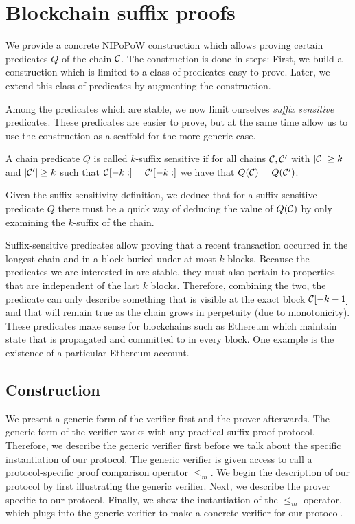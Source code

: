 \section{Blockchain suffix proofs}

We provide a concrete NIPoPoW construction which allows proving certain
predicates $Q$ of the chain $\mathcal{C}$. The construction is done in steps: First,
we build a construction which is limited to a class of predicates easy to prove.
Later, we extend this class of predicates by augmenting the construction.

Among the predicates which are stable, we now limit ourselves \textit{suffix
sensitive} predicates. These predicates are easier to prove, but at the same
time allow us to use the construction as a scaffold for the more generic case.

\begin{definition}
A chain predicate $Q$ is called $k$-\textnormal{suffix sensitive} if for all
chains $\mathcal{C}, \mathcal{C}'$ with $|\mathcal{C}| \geq k$ and $|\mathcal{C}'| \geq k$ such that
$\mathcal{C}[-k:] = \mathcal{C}'[-k:]$ we have that $Q(\mathcal{C}) = Q(\mathcal{C}')$.
\end{definition}

Given the suffix-sensitivity definition, we deduce that for a suffix-sensitive
predicate $Q$ there must be a quick way of deducing the value of $Q(\mathcal{C})$ by
only examining the $k$-suffix of the chain.

Suffix-sensitive predicates allow proving that a recent transaction occurred in
the longest chain and in a block buried under at most $k$ blocks. Because the
predicates we are interested in are stable, they must also pertain to properties
that are independent of the last $k$ blocks. Therefore, combining the two, the
predicate can only describe something that is visible at the exact block
$\mathcal{C}[-k-1]$ and that will remain true as the chain grows in perpetuity (due
to monotonicity). These predicates make sense for blockchains such as Ethereum
which maintain state \cite{vitalik} that is propagated and committed to in every
block. One example is the existence of a particular Ethereum account.

\subsection{Construction}

We present a generic form of the verifier first and the prover afterwards. The
generic form of the verifier works with any practical suffix proof protocol.
Therefore, we describe the generic verifier first before we talk about the
specific instantiation of our protocol. The generic verifier is given access to
call a protocol-specific proof comparison operator $\leq_m$. We begin the
description of our protocol by first illustrating the generic verifier. Next, we
describe the prover specific to our protocol. Finally, we show the instantiation
of the $\leq_m$ operator, which plugs into the generic verifier to make a
concrete verifier for our protocol.

